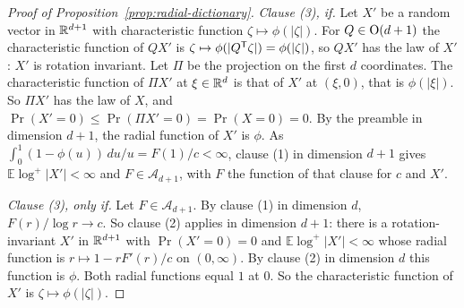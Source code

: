 \begin{proof}[Proof of Proposition~\ref{prop:radial-dictionary}]
\emph{Clause (3), if.} Let $X'$ be a random vector in $\mathbb{R}^{d+1}$ with characteristic function
$\zeta \mapsto \phi(|\zeta|)$. For $Q \in \mathrm{O}(d+1)$ the characteristic function of $QX'$ is
$\zeta \mapsto \phi(|Q^{\mathsf{T}}\zeta|) = \phi(|\zeta|)$, so $QX'$ has the law of $X'$: $X'$ is
rotation invariant. Let $\Pi$ be the projection on the first $d$ coordinates. The characteristic
function of $\Pi X'$ at $\xi \in \mathbb{R}^d$ is that of $X'$ at $(\xi,0)$, that is $\phi(|\xi|)$. So
$\Pi X'$ has the law of $X$, and $\Pr(X' = 0) \le \Pr(\Pi X' = 0) = \Pr(X = 0) = 0$. By the
preamble in dimension $d + 1$, the radial function of $X'$ is $\phi$. As
$\int_0^1(1 - \phi(u))\,du/u = F(1)/c < \infty$, clause (1) in dimension $d + 1$ gives
$\mathbb{E}\log^+|X'| < \infty$ and $F \in \mathcal{A}_{d+1}$, with $F$ the function of that
clause for $c$ and $X'$.

\emph{Clause (3), only if.} Let $F \in \mathcal{A}_{d+1}$. By clause (1) in dimension $d$,
$F(r)/\log r \to c$. So clause (2) applies in dimension $d + 1$: there is a rotation-invariant
$X'$ in $\mathbb{R}^{d+1}$ with $\Pr(X' = 0) = 0$ and $\mathbb{E}\log^+|X'| < \infty$ whose radial
function is $r \mapsto 1 - rF'(r)/c$ on $(0,\infty)$. By clause (2) in dimension $d$ this
function is $\phi$. Both radial functions equal $1$ at $0$. So the characteristic function of
$X'$ is $\zeta \mapsto \phi(|\zeta|)$.
\end{proof}

